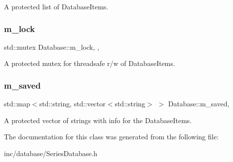 A protected list of Database\+Items. 

\mbox{\label{classDatabase_a7f55f3a5d93c9694ee4f08a2f2135b1d}} 
\subsubsection{\texorpdfstring{m\+\_\+lock}{m\_lock}}
{\footnotesize\ttfamily std\+::mutex Database\+::m\+\_\+lock\hspace{0.3cm}{\ttfamily [mutable]}, {\ttfamily [protected]}, {\ttfamily [inherited]}}



A protected mutex for threadsafe r/w of Database\+Items. 

\mbox{\label{classDatabase_a9f87cbe5a1be71d541083dffa8d8c9ad}} 
\subsubsection{\texorpdfstring{m\+\_\+saved}{m\_saved}}
{\footnotesize\ttfamily std\+::map$<$std\+::string, std\+::vector$<$std\+::string$>$ $>$ Database\+::m\+\_\+saved\hspace{0.3cm}{\ttfamily [protected]}, {\ttfamily [inherited]}}



A protected vector of strings with info for the Database\+Items. 



The documentation for this class was generated from the following file\+:\begin{DoxyCompactItemize}
\item 
inc/database/Series\+Database.\+h\end{DoxyCompactItemize}
